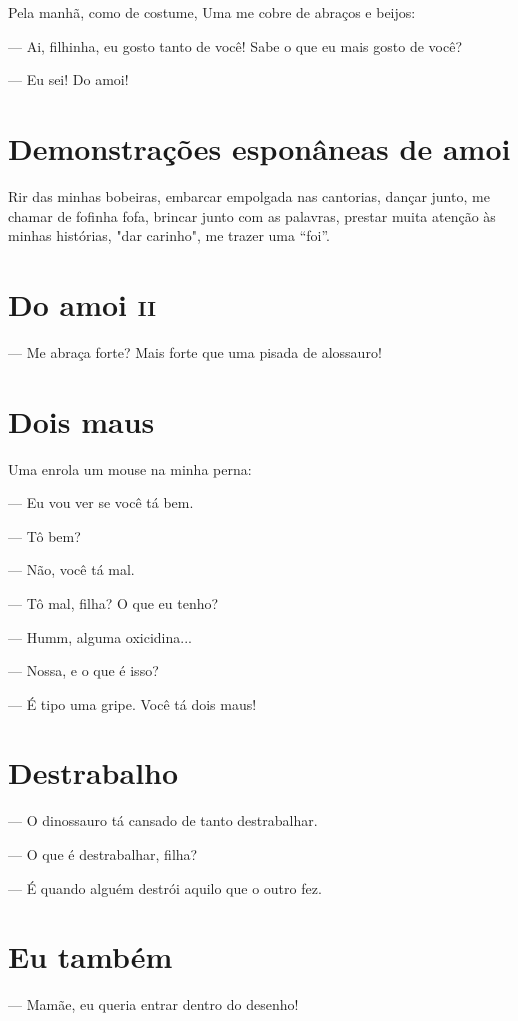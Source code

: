 Pela manhã, como de costume, Uma me cobre de abraços e beijos:

— Ai, filhinha, eu gosto tanto de você! Sabe o que eu mais gosto de
você?

— Eu sei! Do amoi!

\chapter{Demonstrações esponâneas de amoi}

Rir das minhas bobeiras, embarcar empolgada nas cantorias, dançar junto,
me chamar de fofinha fofa, brincar junto com as palavras, prestar muita
atenção às minhas histórias, "dar carinho", me trazer uma ``foi''.

\chapter{Do amoi \textsc{ii}}

— Me abraça forte? Mais forte que uma pisada de alossauro!

\chapter{Dois maus}

Uma enrola um mouse na minha perna:

— Eu vou ver se você tá bem.

— Tô bem?

— Não, você tá mal.

— Tô mal, filha? O que eu tenho?

— Humm, alguma oxicidina...

— Nossa, e o que é isso?

— É tipo uma gripe. Você tá dois maus!

\chapter{Destrabalho}

— O dinossauro tá cansado de tanto destrabalhar.

— O que é destrabalhar, filha?

— É quando alguém destrói aquilo que o outro fez.

\chapter{Eu também}

— Mamãe, eu queria entrar dentro do desenho!

